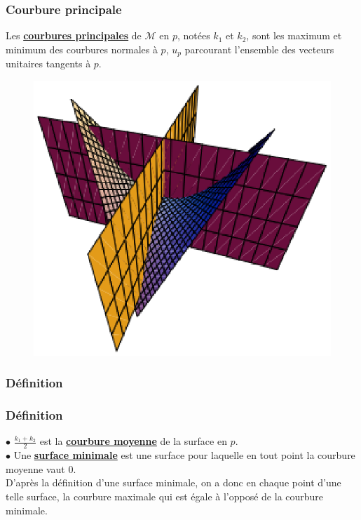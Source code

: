\documentclass{beamer}
\newcommand{\gs}[1]{\textbf{\underline{#1}}}
\begin{document}
\begin{frame}
\frametitle{Courbure principale}
Les \gs{courbures principales} de $\mathscr{M}$ en $p$, notées $k_1$ et $k_2$, sont les maximum et minimum des courbures normales à $p$, $u_p$ parcourant l'ensemble des vecteurs unitaires tangents à $p$.\\
\begin{figure}[h!]
      \centering 
      \legend{}
      \includegraphics[scale=0.5]{2.eps}
\end{figure}
\end{frame}

\subsubsection{Définition}

\begin{frame}
\frametitle{Définition}
$\bullet$ $\frac{k_1+k_2}{2}$ est la \gs{courbure moyenne} de la surface en $p$.\vspace{0.5cm}\\
\pause
$\bullet$ Une \gs{surface minimale} est une surface pour laquelle en tout point la courbure moyenne vaut 0.\vspace{0.5cm}\\
\pause
D'après la définition d'une surface minimale, on a donc en chaque point d'une telle surface, la courbure maximale qui est égale à l'opposé de la courbure minimale.
\end{frame}
\end{document}
